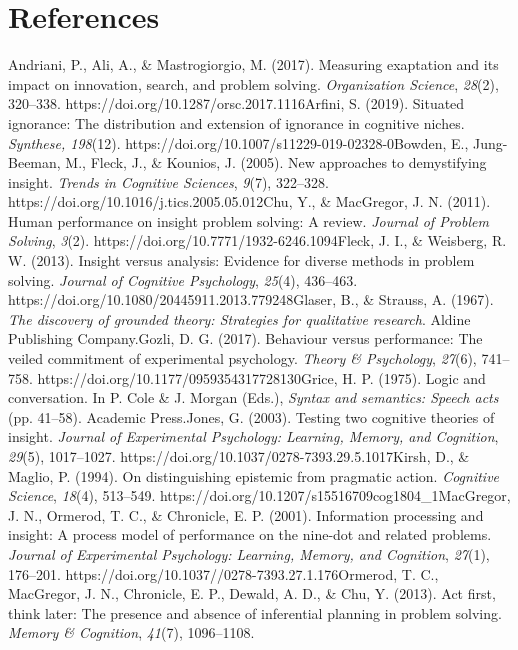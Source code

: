 \documentclass[twocolumn, serif, empirical, authordate]{jote-article}
\begin{document}
{{ 
\section{References}

Andriani, P., Ali, A., \& Mastrogiorgio, M. (2017). Measuring exaptation and its impact on innovation, search, and problem solving.
\emph{Organization Science}, \emph{28}(2), 320--338.
https://doi.org/10.1287/orsc.2017.1116Arfini, S. (2019). Situated ignorance: The distribution and extension of ignorance in cognitive niches. \emph{Synthese, 198}(12).
https://doi.org/10.1007/s11229-019-02328-0Bowden, E., Jung-Beeman, M., Fleck, J., \& Kounios, J. (2005). New approaches to demystifying insight. \emph{Trends in Cognitive Sciences}, \emph{9}(7), 322--328.
https://doi.org/10.1016/j.tics.2005.05.012Chu, Y., \& MacGregor, J. N.
(2011). Human performance on insight problem solving: A review.
\emph{Journal of Problem Solving}, \emph{3}(2).
https://doi.org/10.7771/1932-6246.1094Fleck, J. I., \& Weisberg, R. W.
(2013). Insight versus analysis: Evidence for diverse methods in problem solving. \emph{Journal of Cognitive Psychology}, \emph{25}(4), 436--463.
https://doi.org/10.1080/20445911.2013.779248Glaser, B., \& Strauss, A.
(1967). \emph{The discovery of grounded theory: Strategies for qualitative research}. Aldine Publishing Company.Gozli, D. G. (2017).
Behaviour versus performance: The veiled commitment of experimental psychology. \emph{Theory \& Psychology}, \emph{27}(6), 741--758.
https://doi.org/10.1177/0959354317728130Grice, H. P. (1975). Logic and conversation. In P. Cole \& J. Morgan (Eds.), \emph{Syntax and semantics: Speech acts} (pp. 41--58). Academic Press.Jones, G. (2003).
Testing two cognitive theories of insight. \emph{Journal of Experimental Psychology: Learning, Memory, and Cognition}, \emph{29}(5), 1017--1027.
https://doi.org/10.1037/0278-7393.29.5.1017Kirsh, D., \& Maglio, P.
(1994). On distinguishing epistemic from pragmatic action.
\emph{Cognitive Science}, \emph{18}(4), 513--549.
https://doi.org/10.1207/s15516709cog1804\_1MacGregor, J. N., Ormerod, T.
C., \& Chronicle, E. P. (2001). Information processing and insight: A process model of performance on the nine-dot and related problems.
\emph{Journal of Experimental Psychology: Learning, Memory, and Cognition}, \emph{27}(1), 176--201.
https://doi.org/10.1037//0278-7393.27.1.176Ormerod, T. C., MacGregor, J.
N., Chronicle, E. P., Dewald, A. D., \& Chu, Y. (2013). Act first, think later: The presence and absence of inferential planning in problem solving. \emph{Memory \& Cognition}, \emph{41}(7), 1096--1108.
}}
\end{document}
